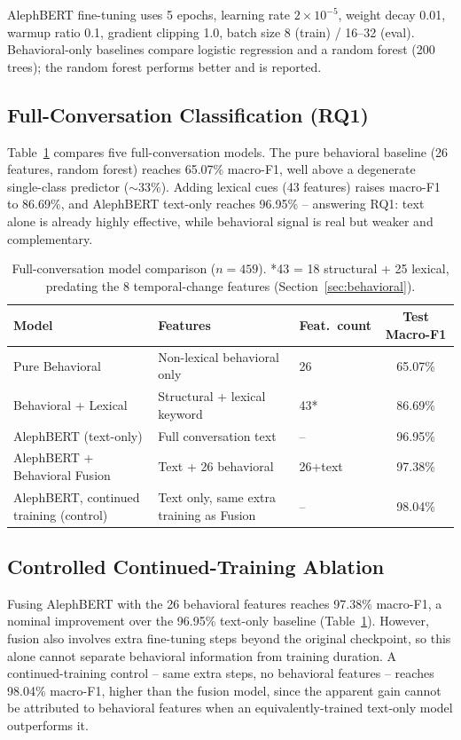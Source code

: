 \documentclass{article}
\begin{document}
AlephBERT fine-tuning uses 5 epochs, learning rate $2\times10^{-5}$, weight decay 0.01, warmup ratio 0.1, gradient clipping 1.0, batch size 8 (train) / 16--32 (eval). Behavioral-only baselines compare logistic regression and a random forest (200 trees); the random forest performs better and is reported.

\subsection{Full-Conversation Classification (RQ1)}
\label{sec:fullconv}

Table~\ref{tab:table1} compares five full-conversation models. The pure behavioral baseline (26 features, random forest) reaches 65.07\% macro-F1, well above a degenerate single-class predictor ($\sim$33\%). Adding lexical cues (43 features) raises macro-F1 to 86.69\%, and AlephBERT text-only reaches 96.95\% -- answering RQ1: text alone is already highly effective, while behavioral signal is real but weaker and complementary.

\begin{table}[htbp]
\centering
\small
\begin{tabular}{@{}p{3.1cm}p{3.6cm}p{1.6cm}c@{}}
\toprule
Model & Features & Feat.\ count & Test Macro-F1 \\
\midrule
Pure Behavioral & Non-lexical behavioral only & 26 & 65.07\% \\
Behavioral + Lexical & Structural + lexical keyword & 43* & 86.69\% \\
AlephBERT (text-only) & Full conversation text & -- & 96.95\% \\
AlephBERT + Behavioral Fusion & Text + 26 behavioral & 26+text & 97.38\% \\
AlephBERT, continued training (control) & Text only, same extra training as Fusion & -- & 98.04\% \\
\bottomrule
\end{tabular}
\caption{Full-conversation model comparison ($n=459$). *43 = 18 structural + 25 lexical, predating the 8 temporal-change features (Section~\ref{sec:behavioral}).}
\label{tab:table1}
\end{table}

\subsection{Controlled Continued-Training Ablation}
\label{sec:ablation}

Fusing AlephBERT with the 26 behavioral features reaches 97.38\% macro-F1, a nominal improvement over the 96.95\% text-only baseline (Table~\ref{tab:table1}). However, fusion also involves extra fine-tuning steps beyond the original checkpoint, so this alone cannot separate behavioral information from training duration. A continued-training control -- same extra steps, no behavioral features -- reaches 98.04\% macro-F1, higher than the fusion model, since the apparent gain cannot be attributed to behavioral features when an equivalently-trained text-only model outperforms it.
\end{document}
